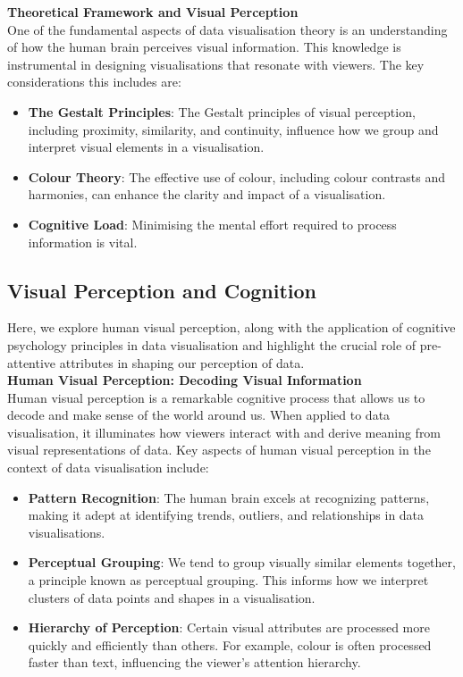\documentclass{article}\usepackage[]{graphicx}\usepackage[]{xcolor}
\begin{document}
\textbf{Theoretical Framework and Visual Perception}\\
One of the fundamental aspects of data visualisation theory is an understanding of how the human brain perceives visual information. This knowledge is instrumental in designing visualisations that resonate with viewers. The key considerations this includes are:
\begin{itemize}
    \item \textbf{The Gestalt Principles}: The Gestalt principles of visual perception, including proximity, similarity, and continuity, influence how we group and interpret visual elements in a visualisation.
    \item \textbf{Colour Theory}: The effective use of colour, including colour contrasts and harmonies, can enhance the clarity and impact of a visualisation.
    \item \textbf{Cognitive Load}: Minimising the mental effort required to process information is vital.
\end{itemize}

\subsection{Visual Perception and Cognition}
Here, we explore human visual perception, along with the application of cognitive psychology principles in data visualisation and highlight the crucial role of pre-attentive attributes in shaping our perception of data.\\ 

\textbf{Human Visual Perception: Decoding Visual Information}\\
Human visual perception is a remarkable cognitive process that allows us to decode and make sense of the world around us. When applied to data visualisation, it illuminates how viewers interact with and derive meaning from visual representations of data. Key aspects of human visual perception in the context of data visualisation include:
\begin{itemize}
    \item \textbf{Pattern Recognition}: The human brain excels at recognizing patterns, making it adept at identifying trends, outliers, and relationships in data visualisations.
    \item \textbf{Perceptual Grouping}: We tend to group visually similar elements together, a principle known as perceptual grouping. This informs how we interpret clusters of data points and shapes in a visualisation.
    \item \textbf{Hierarchy of Perception}: Certain visual attributes are processed more quickly and efficiently than others. For example, colour is often processed faster than text, influencing the viewer's attention hierarchy.
\end{itemize}
\end{document}
